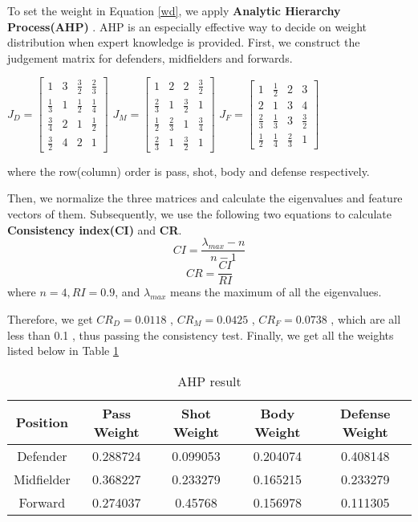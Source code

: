 \documentclass{mcmthesis}
\begin{document}
To set the weight in Equation \eqref{wd}, we apply \textbf{Analytic Hierarchy Process(AHP)} \cite{AHP}. AHP is an especially effective way to decide on weight distribution when expert knowledge is provided. First, we construct the judgement matrix for defenders, midfielders and forwards.
\begin{center}
$J_{D} = \left[ {\begin{array}{*{20}{c}}
1 & 3 & \frac{3}{2} & \frac{2}{3} \\
\frac{1}{3} & 1 & \frac{1}{2} & \frac{1}{4} \\
\frac{3}{4} & 2 & 1 & \frac{1}{2} \\
\frac{3}{2} & 4 & 2 & 1
\end{array}} \right]$ $J_{M} = \left[ {\begin{array}{*{20}{c}}
1 & 2 & 2 & \frac{3}{2} \\
\frac{2}{3} & 1 & \frac{3}{2} & 1 \\
\frac{1}{2} & \frac{2}{3} & 1 & \frac{3}{4} \\
\frac{2}{3} & 1 & \frac{3}{2} & 1
\end{array}} \right]$ $J_{F} = \left[ {\begin{array}{*{20}{c}}
1 & \frac{1}{2} & 2 & 3 \\
2 & 1 & 3 & 4 \\
\frac{2}{3} & \frac{1}{3} & 3 & \frac{3}{2} \\
\frac{1}{2} & \frac{1}{4} & \frac{2}{3} & 1
\end{array}} \right]$
\end{center}
where the row(column) order is pass, shot, body and defense respectively.

Then, we normalize the three matrices and calculate the eigenvalues and feature vectors of them. Subsequently, we use the following two equations to calculate \textbf{Consistency index(CI)} and \textbf{CR}.
$$
    CI=\frac{\lambda_{max}-n}{n-1}
$$
$$
    CR=\frac{CI}{RI}
$$
where $n = 4, RI = 0.9$, and $\lambda_{max}$ means the maximum of all the eigenvalues.

Therefore, we get $CR_{D}=0.0118$ , $CR_{M}=0.0425$ , $CR_{F}=0.0738$ , which are all less than 0.1 , thus passing the consistency test. Finally, we get all the weights listed below in Table \ref{AHP_table}
\begin{table}[h]
    \centering
    \caption{AHP result}
    \label{AHP_table}
    \begin{tabular}{c c c c c}
\hline
    	Position & Pass Weight & Shot Weight & Body Weight & Defense Weight \\
\hline
	Defender & 0.288724 & 0.099053 & 0.204074 & 0.408148\\
	Midfielder & 0.368227 & 0.233279 & 0.165215 &0.233279\\
	Forward & 0.274037 & 0.45768 & 0.156978 & 0.111305\\
\hline
    \end{tabular}
\end{table}
\end{document}
